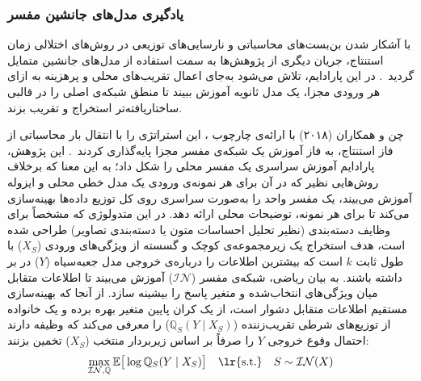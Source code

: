 \subsubsection{یادگیری مدل‌های جانشین مفسر}\label{sec:3-1-3-3}

با آشکار شدن بن‌بست‌های محاسباتی و نارسایی‌های توزیعی در روش‌های اختلالی زمان استنتاج، جریان دیگری از پژوهش‌ها به سمت استفاده از مدل‌های جانشین متمایل گردید~\cite{guidotti2018survey, danilevsky2020survey}. در این پارادایم، تلاش می‌شود به‌جای اعمال تقریب‌های محلی و پرهزینه به ازای هر ورودی مجزا، یک مدل ثانویه آموزش ببیند تا منطق شبکه‌ی اصلی را در قالبی ساختاریافته‌تر استخراج و تقریب بزند.

چن و همکاران (۲۰۱۸) با ارائه‌ی چارچوب ، این استراتژی را با انتقال بار محاسباتی از فاز استنتاج، به فاز آموزش یک شبکه‌ی مفسر مجزا پایه‌گذاری کردند~\cite{chen2018learning}. این پژوهش، پارادایم آموزش سراسری یک مفسر محلی را شکل داد؛ به این معنا که برخلاف روش‌هایی نظیر  که در آن برای هر نمونه‌ی ورودی یک مدل خطی محلی و ایزوله آموزش می‌بیند،  یک مفسر واحد را به‌صورت سراسری روی کل توزیع داده‌ها بهینه‌سازی می‌کند تا برای هر نمونه، توضیحات محلی ارائه دهد. در این متدولوژی که مشخصاً برای وظایف دسته‌بندی (نظیر تحلیل احساسات متون یا دسته‌بندی تصاویر) طراحی شده است، هدف استخراج یک زیرمجموعه‌ی کوچک و گسسته از ویژگی‌های ورودی ($X_S$) با طول ثابت $k$ است که بیشترین اطلاعات را درباره‌ی خروجی مدل جعبه‌سیاه ($Y$) در بر داشته باشند. به بیان ریاضی، شبکه‌ی مفسر ($\mathcal{IN}$) آموزش می‌بیند تا اطلاعات متقابل میان ویژگی‌های انتخاب‌شده و متغیر پاسخ را بیشینه سازد. از آنجا که بهینه‌سازی مستقیم اطلاعات متقابل دشوار است،  از یک کران پایین متغیر بهره برده و یک خانواده از توزیع‌های شرطی تقریب‌زننده ($\mathbb{Q}_S(Y \mid X_S)$) را معرفی می‌کند که وظیفه دارند احتمال وقوع خروجی $Y$ را صرفاً بر اساس زیربردار منتخب ($X_S$) تخمین بزنند:
\begin{equation}\label{eq:chap3_l2x_opt}
    \max_{\mathcal{IN}, \mathbb{Q}} \mathbb{E} \big[ \log \mathbb{Q}_S(Y \mid X_S) \big] \quad \text{\lr{s.t.}} \quad S \sim \mathcal{IN}(X)
\end{equation}
